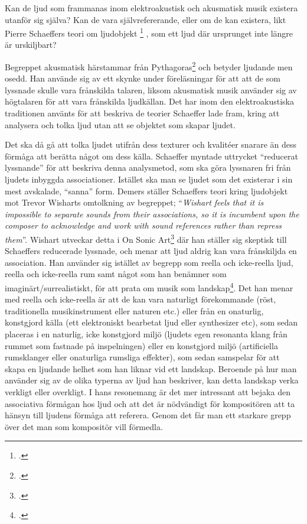 \documentclass{article}
\begin{document}
Kan de ljud som frammanas inom elektroakustisk och akusmatisk musik existera utanför sig själva? Kan de vara
självrefererande, eller om de kan existera, likt Pierre Schaeffers teori om ljudobjekt
\footcite{PierreSchaeffer} , som ett ljud där ursprunget inte längre är urskiljbart?

Begreppet akusmatisk härstammar från Pythagoras\footcite{oxford} och betyder ljudande men osedd. Han använde
sig av ett skynke under föreläsningar för att att de som lyssnade skulle vara frånskilda talaren, liksom
akusmatisk musik använder sig av högtalaren för att vara frånskilda ljudkällan. Det har inom den
elektroakustiska traditionen använts för att beskriva de teorier Schaeffer lade fram, kring att analysera och
tolka ljud utan att se objektet som skapar ljudet.

Det ska då gå att tolka ljudet utifrån dess texturer och kvalitéer snarare än dess förmåga att berätta något
om dess källa. Schaeffer myntade uttrycket ``reducerat lyssnande'' för att beskriva denna analysmetod, som ska
göra lyssnaren fri från ljudets inbyggda associationer. Istället ska man se ljudet som det existerar i sin
mest avskalade, ``sanna'' form. Demers ställer Schaeffers teori kring ljudobjekt mot Trevor Wisharts
omtolkning av begreppet; ``\emph{Wishart feels that it is impossible to separate sounds from
their associations, so it is incumbent upon the composer to acknowledge and work with sound references rather
than repress them}''. Wishart utveckar detta i On Sonic Art\footcite{TrevorWishart} där han ställer sig
skeptisk till Schaeffers reducerade lyssnade, och menar att ljud aldrig kan vara frånskiljda en
association. Han använder sig istället av begrepp som reella och icke-reella ljud, reella och icke-reella
rum samt något som han benämner som imaginärt/surrealistiskt, för att prata om musik som
landskap\footcite[144-147]{TrevorWishart}. Det han menar med reella och icke-reella är att de kan vara
naturligt förekommande (röst, traditionella musikinstrument eller naturen etc.) eller från en onaturlig,
konstgjord källa (ett elektroniskt bearbetat ljud eller synthesizer etc), som sedan placeras i en naturlig,
icke konstgjord miljö (ljudets egen resonanta klang från rummet som fastnade på inspelningen) eller en
konstgjord miljö (artificiella rumsklanger eller onaturliga rumsliga effekter), som sedan samspelar för att
skapa en ljudande helhet som han liknar vid ett landskap. Beroende på hur man använder sig av de olika typerna
av ljud han beskriver, kan detta landskap verka verkligt eller overkligt. I hans resonemang är det mer
intressant att bejaka den associativa förmågan hos ljud och att det är nödvändigt för kompositören att ta
hänsyn till ljudens förmåga att referera. Genom det får man ett starkare grepp över det man som kompositör
vill förmedla.
\end{document}
